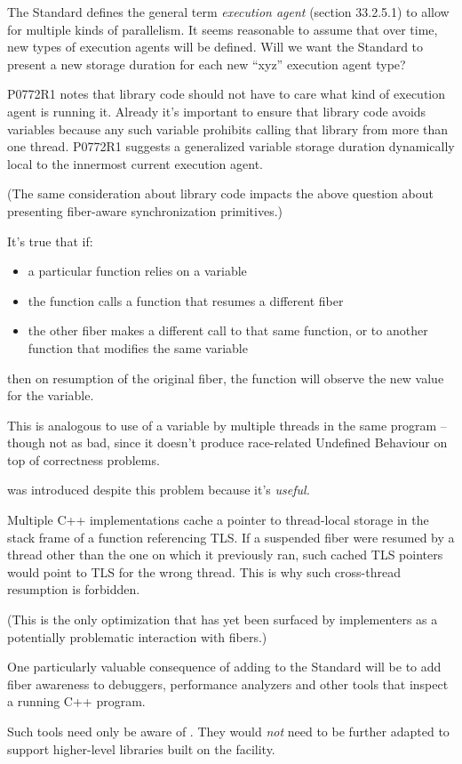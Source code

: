 The Standard defines the general term \emph{execution agent} (section
33.2.5.1) to allow for multiple kinds of parallelism. It seems reasonable to
assume that over time, new types of execution agents will be defined. Will we
want the Standard to present a new  storage duration for each
new ``xyz'' execution agent type?

P0772R1\cite{P0772R1} notes that library code should not have to care what
kind of execution agent is running it. Already it's important to ensure that
library code avoids  variables because any such variable prohibits
calling that library from more than one thread. P0772R1 suggests a generalized
variable storage duration dynamically local to the innermost current execution
agent.

(The same consideration about library code impacts the above question about
presenting fiber-aware synchronization primitives.)

It's true that if:

\begin{itemize}
    \item a particular function relies on a  variable
    \item the function calls a function that resumes a different fiber
    \item the other fiber makes a different call to that same function, or to
          another function that modifies the same  variable
\end{itemize}

then on resumption of the original fiber, the function will observe the new
value for the  variable.

This is analogous to use of a  variable by multiple threads in the
same program -- though not as bad, since it doesn't produce race-related
Undefined Behaviour on top of correctness problems.

 was introduced despite this problem because it's \emph{useful.}

Multiple C++ implementations cache a pointer to thread-local storage in the
stack frame of a function referencing TLS. If a suspended fiber were resumed
by a thread other than the one on which it previously ran, such cached TLS
pointers would point to TLS for the wrong thread. This is why such
cross-thread resumption is forbidden.

(This is the only optimization that has yet been surfaced by implementers as a
potentially problematic interaction with fibers.)

 One particularly valuable consequence of adding \fiber to
the Standard will be to add fiber awareness to debuggers, performance
analyzers and other tools that inspect a running C++ program.

Such tools need only be aware of \fiber. They would \emph{not} need to be
further adapted to support higher-level libraries built on
the \fiber facility.

\newpage
